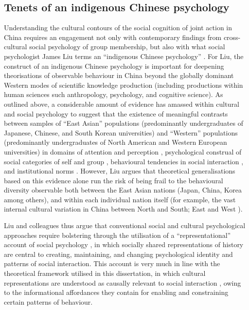 \begin{CJK}{UTF8}{gbsn}
\subsection{Tenets of an indigenous Chinese psychology\label{sect:indigPsych}}
Understanding the cultural contours of the social cognition of joint action in China requires an engagement not only with contemporary findings from cross-cultural social psychology of group membership, but also with what social psychologist James Liu terms an ``indigenous Chinese psychology'' \citep{Triandis1996,Liu2009}.  For Liu, the construct of an indigenous Chinese psychology is important for deepening theorisations of observable behaviour in China beyond the globally dominant Western modes of scientific knowledge production (including productions within human sciences such anthropology, psychology, and cognitive science).  As outlined above, a considerable amount of evidence has amassed within cultural and social psychology to suggest that the existence of meaningful contrasts between samples of ``East Asian'' populations (predominantly undergraduates of Japanese, Chinese, and South Korean universities) and ``Western'' populations (predominantly undergraduates of North American and Western European universities) in domains of attention and perception \citep{Peng1997,Nisbett2003}, psychological construal of social categories of self and group \citep{Markus1991}, behavioural tendencies in social interaction \citep{Yuki2003}, and institutional norms \citep{Liu2017}.  However, Liu argues that theoretical generalisations based on this evidence alone run the risk of being frail to the behavioural diversity observable both between the East Asian nations (Japan, China, Korea among others), and within each individual nation itself (for example, the vast internal cultural variation in China between North and South; East and West \citep[see, for example,][]{Henrich2014}).

Liu and colleagues thus argue that conventional social and cultural psychological approaches require bolstering through the utilisation of a ``representational'' account of social psychology \citep{Liu2005}, in which socially shared representations of history are central to creating, maintaining, and changing psychological identity and patterns of social interaction.  This account is very much in line with the theoretical framework utilised in this dissertation, in which cultural representations are understood as causally relevant to social interaction \citep{Vesper2017}, owing to the informational affordances they contain for enabling and constraining certain patterns of behaviour.


\end{CJK}
